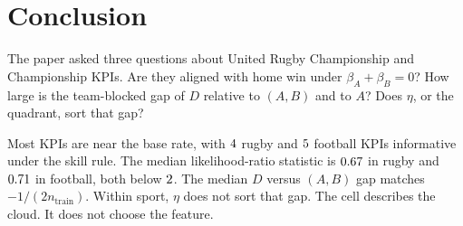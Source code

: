\section{Conclusion}

The paper asked three questions about United Rugby Championship and Championship KPIs.
Are they aligned with home win under $\beta_A+\beta_B=0$?
How large is the team-blocked gap of $D$ relative to $(A,B)$ and to $A$?
Does $\eta$, or the quadrant, sort that gap?

Most KPIs are near the base rate, with $4$ rugby and $5$ football KPIs informative under the skill rule.
The median likelihood-ratio statistic is $0.67$ in rugby and $0.71$ in football, both below $2$.
The median $D$ versus $(A,B)$ gap matches $-1/(2n_{\mathrm{train}})$.
Within sport, $\eta$ does not sort that gap.
The cell describes the cloud.
It does not choose the feature.
